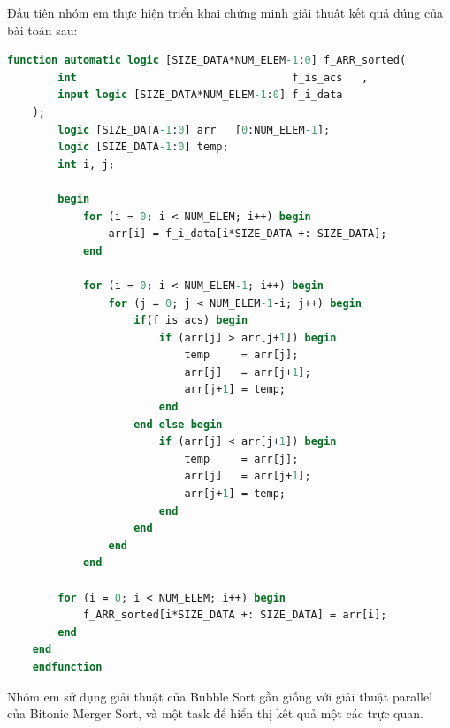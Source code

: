 
Đầu tiên nhóm em thực hiện triển khai chứng minh giải thuật kết quả đúng của bài toán sau:

\begin{lstlisting}[style=StyleCode, language=SystemVerilog, caption={Giải thuật chứng minh bộ Bitonic Merger Sort 8 phần tử.}]
	function automatic logic [SIZE_DATA*NUM_ELEM-1:0] f_ARR_sorted(
		int                                  f_is_acs   ,
		input logic [SIZE_DATA*NUM_ELEM-1:0] f_i_data
	);
		logic [SIZE_DATA-1:0] arr   [0:NUM_ELEM-1];
		logic [SIZE_DATA-1:0] temp;
		int i, j;
	
		begin
			for (i = 0; i < NUM_ELEM; i++) begin
				arr[i] = f_i_data[i*SIZE_DATA +: SIZE_DATA];
			end
			
			for (i = 0; i < NUM_ELEM-1; i++) begin
				for (j = 0; j < NUM_ELEM-1-i; j++) begin
					if(f_is_acs) begin
						if (arr[j] > arr[j+1]) begin
							temp     = arr[j];
							arr[j]   = arr[j+1];
							arr[j+1] = temp;
						end 
					end else begin
						if (arr[j] < arr[j+1]) begin
							temp     = arr[j];
							arr[j]   = arr[j+1];
							arr[j+1] = temp;
						end
					end
				end
			end
	
		for (i = 0; i < NUM_ELEM; i++) begin
			f_ARR_sorted[i*SIZE_DATA +: SIZE_DATA] = arr[i];
		end
	end
	endfunction
\end{lstlisting}

Nhóm em sử dụng giải thuật của Bubble Sort gần giống với giải thuật parallel của Bitonic Merger Sort, và một task để hiển thị kêt quả một các trực quan.

